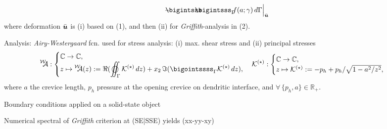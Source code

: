 \documentclass[25pt, a0paper,
portrait,
margin=2mm, 
innermargin=2mm, 
blockverticalspace=7mm, %
colspace=2mm, %
subcolspace=0mm]{tikzposter}
\makeatletter
\newcommand*{\inputfig}[3][htb]{{
    \def\fps@figure{#1}
    \def\DIR{#2}
    \def\LABEL{#3}
    \graphicspath{{\DIR/}}
    
}}
\newcommand{\WA}{\prescript{\mathcal{W}}{}{\!\!\!\mathcal{A}}}
\newcommand{\WAz}{\prescript{\mathcal{W}}{}{\!\!\!\mathcal{A}}(z)}
\newcommand{\mbR}{\mathbb{R}}
\newcommand{\mbC}{\mathbb{C}}
\newcommand{\mcK}{\mathcal{K}}
\newcommand{\bigoiintsssss}{\varoiint}
\makeatother
\begin{document}
{\begin{minipage}{0.43\textwidth}
\begin{mdframed}
\begin{align}
{					- 
					\!\!\!\!
					\bigintsss\!\!\!\!\!\!\bigintsss_{\Gamma}
					\!\!
					f(a;\gamma) \, d\Gamma
				}
				\Big|_{\bar{\bm{u}}}
			\end{align}
			where deformation $\bar{{\boldsymbol{\mathnormal u}}}$ is (i) based on (1), 
			and then (ii) for \emph{Griffith}-analysis in (2).
		\end{mdframed}
	\end{minipage}
	\hfill
	\begin{minipage}{0.54\textwidth}
		\begin{mdframed}
			Analysis: \textit{Airy-Westergaard} fcn. used for stress analysis:
			(i) max. shear stress and (ii) principal stresses
			\vspace{-0.2cm}
			\begin{align*}
				\WA:
				\begin{cases}
					\mbC\to\mbC, \\
					\displaystyle
					z \mapsto \WAz:=
					\Re(\bigoiintsssss_{\Gamma} \mcK^{(\star)}\,dz )
					+ x_2\,
					\Im(\bigointssss_{\Gamma} \mcK^{(\star)}\,dz ),
				\end{cases}
				\mcK^{(\star)}:
				\begin{cases}
					\mbC \to \mbC, \\
					z \mapsto 
					\mcK^{(\star)}:=
					- p_{h} + p_{h}/\sqrt{1 - a^2/z^2},\
				\end{cases}
			\end{align*}
			\vspace{-0.3cm}
			where $a$ the crevice length, $p_{h}$ pressure at the opening crevice on dendritic interface, and $\forall \, \{p_{h},a\}\in\mbR_{+}$.
		\end{mdframed}
		\begin{minipage}{0.7\textwidth}
			\begin{mdframed}
				Boundary conditions applied on a solid-state object
				\begin{center}
					\inputfig{floats/structuraltwofields}{structuraltwofields}
				\end{center}
			\end{mdframed}
			\begin{mdframed}
				Numerical spectral of \emph{Griffith} criterion at (SE|SSE) yields (xx-yy-xy)
				\begin{center}
					\inputfig{floats/routine_woTV_numa_3x5}{routine_woTV_numa_3x5}
				\end{center}

\end{mdframed}
\end{minipage}
\end{minipage}}
\end{document}
